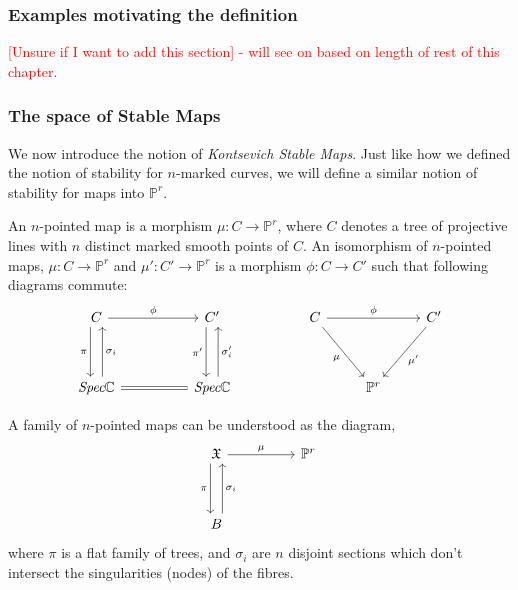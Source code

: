 \subsubsection{Examples motivating the definition}
\textcolor{red}{[Unsure if I want to add this section] - will see on based on length of rest of this chapter.}

\subsubsection{The space of Stable Maps}
We now introduce the notion of \textit{Kontsevich Stable Maps}.
Just like how we defined the notion of stability for $n$-marked curves, we will define a similar notion of stability for maps into $\mathbb{P}^{r}$.
\begin{definition}
    An $n$-pointed map is a morphism $\mu : C \to \mathbb{P}^{r}$, where $C$ denotes a tree of projective lines with $n$ distinct marked smooth points of $C$.
    An isomorphism of $n$-pointed maps, $\mu : C \to \mathbb{P}^{r}$ and $\mu' : C' \to \mathbb{P}^{r}$ is a morphism $\phi : C \to C'$ such that following diagrams commute:
\[
    \begin{tikzcd}
        C & & C' & & C & & C' \\
        \\
        \emph{Spec}\mathbb{C} & & \emph{Spec}\mathbb{C} & & & \mathbb{P}^{r} & 
        \arrow["\phi", from = 1-1, to = 1-3]
        \arrow["\phi", from = 1-5, to = 1-7]
        \arrow[swap,"\mu", from = 1-5, to = 3-6]
        \arrow["\mu'", from = 1-7, to = 3-6]
        \arrow[swap,"\pi", from = 1-1, to = 3-1, xshift = -1ex]
        \arrow[swap,"\pi'", from = 1-3, to = 3-3, xshift = -1ex]
        \arrow[equal, from = 3-1, to = 3-3]
        \arrow[swap,"\sigma_{i}", from = 3-1, to = 1-1, xshift = 1ex]
        \arrow[swap,"\sigma'_{i}", from = 3-3, to = 1-3, xshift = 1ex]
    \end{tikzcd}
\]
\end{definition}
A family of $n$-pointed maps can be understood as the diagram,
\[
    \begin{tikzcd}
        \mathfrak{X} & & \mathbb{P}^{r}\\
        \\
        B & &
        \arrow["\mu", from = 1-1, to = 1-3]
        \arrow[swap, "\pi", from = 1-1, to = 3-1, xshift = -1ex]
        \arrow[swap, "\sigma_{i}", from = 3-1, to = 1-1, xshift = 1ex]
    \end{tikzcd}
\]
where $\pi$ is a flat family of trees, and $\sigma_{i}$ are $n$ disjoint sections which don't intersect the singularities (nodes) of the fibres.
